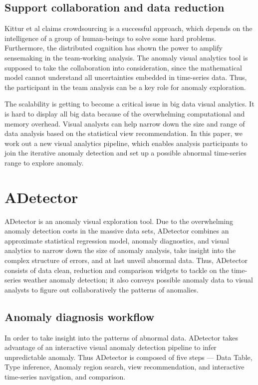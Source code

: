 \documentclass{vgtc}                          %
\begin{document}
\subsection{Support collaboration and data reduction}

Kittur et al\cite{kittur2008crowdsourcing} claims crowdsourcing is a successful approach, which depends on the intelligence of a group of human-beings to solve some hard problems. Furthermore, the distributed cognition\cite{liu2008distributed} has shown the power to amplify sensemaking in the team-working analysis. The anomaly visual analytics tool is supposed to take the collaboration into consideration, since the mathematical model cannot understand all uncertainties embedded in time-series data. Thus, the participant in the team analysis can be a key role for anomaly exploration.
	 
The scalability is getting to become a critical issue in big data visual analytics. It is hard to display all big data because of the overwhelming computational and memory overhead. Visual analysts can help narrow down the size and range of data analysis based on the statistical view recommendation. In this paper, we work out a new visual analytics pipeline, which enables analysis participants to join the iterative anomaly detection and set up a possible abnormal time-series range to explore anomaly.


\section{ADetector}

ADetector is an anomaly visual exploration tool. Due to the overwhelming anomaly detection costs in the massive data sets, ADetector combines an approximate statistical regression model, anomaly diagnostics, and visual analytics to narrow down the size of anomaly analysis, take insight into the complex structure of errors, and at last unveil abnormal data. Thus, ADetector consists of data clean, reduction and comparison widgets to tackle on the time-series weather anomaly detection; it also conveys possible anomaly data to visual analysts to figure out  collaboratively the patterns of anomalies.

\subsection{Anomaly diagnosis workflow}

In order to take insight into the patterns of abnormal data. ADetector takes advantage of an interactive visual anomaly detection pipeline to infer unpredictable anomaly. Thus ADetector is composed of five steps --- Data Table, Type inference, Anomaly region search, view recommendation, and interactive time-series navigation, and comparison.
\end{document}
